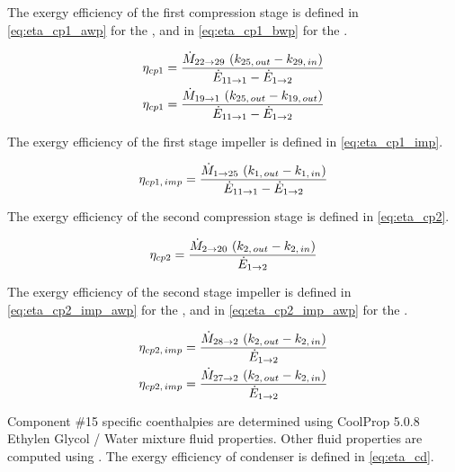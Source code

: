 The exergy efficiency of the first compression stage is defined in \cref{eq:eta_cp1_awp} for the \AWP{}, and in \cref{eq:eta_cp1_bwp} for the \BWP{}.

\begin{subequations}
  \begin{align}
  \eta_{cp1} = \dfrac{\dotM{22}{29} \, \left( k_{25,\,out} - k_{29,\,in} \right)}{\dotE{11}{1} - \dotE{1}{2}}
  \tagaddtextthree{$\left[-\right]$} \label{eq:eta_cp1_awp} \\
  \eta_{cp1} = \dfrac{\dotM{19}{1} \, \left( k_{25,\,out} - k_{19,\,out} \right)}{\dotE{11}{1} - \dotE{1}{2}}
  \tagaddtextthree{$\left[-\right]$} \label{eq:eta_cp1_bwp}
  \end{align}
\end{subequations}

The exergy efficiency of the first stage impeller is defined in
\cref{eq:eta_cp1_imp}.

\begin{equation}
  \label{eq:eta_cp1_imp}
  \eta_{cp1,\,imp} = \dfrac{\dotM{1}{25} \, \left( k_{1,\,out} - k_{1,\,in} \right)}{\dotE{11}{1} - \dotE{1}{2}}
  \tagaddtexttwo{$\left[-\right]$}
\end{equation}

The exergy efficiency of the second compression stage is defined in
\cref{eq:eta_cp2}.

\begin{equation}
  \label{eq:eta_cp2}
  \eta_{cp2} = \dfrac{\dotM{2}{20} \, \left( k_{2,\,out} - k_{2,\,in} \right)}{\dotE{1}{2}}
  \tagaddtexttwo{$\left[-\right]$}
\end{equation}

The exergy efficiency of the second stage impeller is defined in
\cref{eq:eta_cp2_imp_awp} for the \AWP{}, and in
\cref{eq:eta_cp2_imp_awp} for the \BWP{}.

\begin{subequations}
  \begin{align}
    \eta_{cp2,\,imp} = \dfrac{\dotM{28}{2} \, \left( k_{2,\,out} - k_{2,\,in} \right)}{\dotE{1}{2}}
    \tagaddtextthree{$\left[-\right]$} \label{eq:eta_cp2_imp_awp} \\
    \eta_{cp2,\,imp} = \dfrac{\dotM{27}{2} \, \left( k_{2,\,out} - k_{2,\,in} \right)}{\dotE{1}{2}}
    \tagaddtextthree{$\left[-\right]$} \label{eq:eta_cp2_imp_bwp}
  \end{align}
\end{subequations}

Component \#15 specific coenthalpies are determined using CoolProp
5.0.8 \citep{coolprop} Ethylen Glycol / Water mixture fluid
properties. Other fluid properties are computed using \REFPROP{}
\citep{REFPROP90}. The exergy efficiency of condenser is defined in \cref{eq:eta_cd}.

